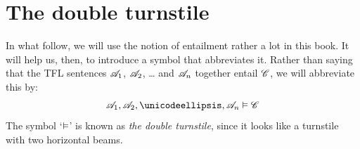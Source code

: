 



\section{The double turnstile}
In what follow, we will use the notion of entailment rather a lot in this book. It will help us, then, to introduce a symbol that abbreviates it. Rather than saying that the TFL sentences $\mathscr{A}_1$, $\mathscr{A}_2$, \dots{} and $\mathscr{A}_n$ together entail $\mathscr{C}$, we will abbreviate this by:
	$$\metav{A}_1, \metav{A}_2, \dots, \metav{A}_n \entails \metav{C}$$
The symbol `$\vDash$' is known as \emph{the double turnstile}, since it looks like a turnstile with two horizontal beams.

